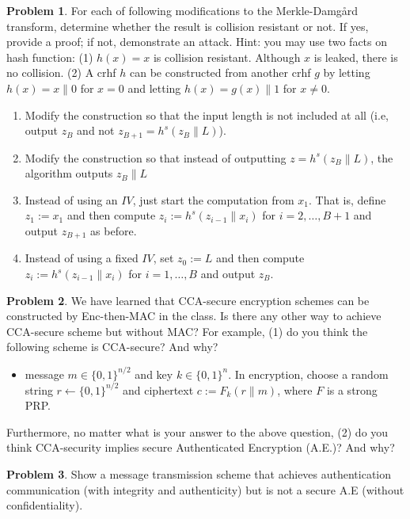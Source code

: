 \documentclass[11pt]{article}
\theoremstyle{definition}
\newtheorem{problem}{Problem}
\begin{document}
\begin{problem}
For each of following modifications to the Merkle-Damg\r{a}rd transform, determine whether the result is collision resistant or not. If yes, provide a proof; if not, demonstrate an attack. {\small Hint: you may use two facts on hash function: (1) $h(x) = x$ is collision resistant. Although $x$ is leaked, there is no collision. (2) A crhf $h$ can be constructed from another crhf $g$ by letting $h(x) = x\|0$ for $x = 0$ and letting $h(x) = g(x)\|1$ for $x \ne 0$. }
\begin{enumerate}
\item Modify the construction so that the input length is not included at all (i.e, output $z_B$ and not $z_{B+1} = h^s(z_B\| L)$).
\item Modify the construction so that instead of outputting $z = h^s(z_B\| L)$, the algorithm outputs $z_B\|L$
\item Instead of using an $IV$, just start the computation from $x_1$. That is, define $z_1 := x_1$ and then compute $z_i := h^s(z_{i-1}\|x_i)$ for $i=2,\dotsc,B+1$ and output $z_{B+1}$ as before.
\item Instead of using a fixed $IV$, set $z_0 := L$ and then compute $z_i := h^s(z_{i-1}\|x_i)$ for $i=1,\dotsc,B$ and output $z_B$.
\end{enumerate}
\end{problem}
\begin{problem}
We have learned that CCA-secure encryption schemes can be constructed by Enc-then-MAC in the class. Is there any other way to achieve CCA-secure scheme but without MAC? For example, (1) do you think the following scheme is CCA-secure? And why?
\begin{itemize}
\item message $m \in \{0,1 \}^{n/2}$ and key $k \in \{0,1 \}^{n}$. In encryption, choose a random string $r \gets \{0,1 \}^{n/2}$ and ciphertext $c := F_{k}(r\| m)$, where $F$ is a strong PRP.
\end{itemize}
Furthermore, no matter what is your answer to the above question, (2) do you think CCA-security implies secure Authenticated Encryption (A.E.)? And why?
\end{problem}
\begin{problem}
Show a message transmission scheme that achieves authentication communication (with integrity and authenticity) but is not a secure A.E (without confidentiality).
\end{problem}
\end{document}
